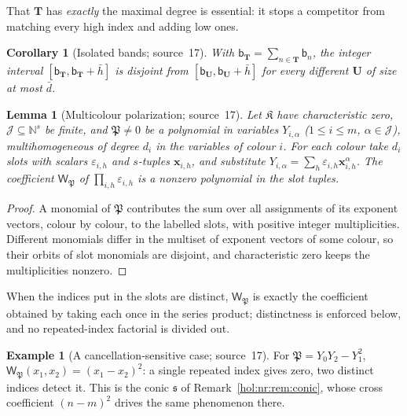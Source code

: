 \documentclass[11pt]{article}
\numberwithin{equation}{section}
\newtheorem{lemma}[theorem]{Lemma}
\newtheorem{corollary}[theorem]{Corollary}
\theoremstyle{definition}
\newtheorem{example}[theorem]{Example}
\theoremstyle{remark}
\newcommand{\N}{\mathbb N}
\begin{document}
That $\mathbf T$ has \emph{exactly} the maximal degree is essential: it stops a
competitor from matching every high index and adding low ones.

\begin{corollary}[Isolated bands; source~17]\label{hol:fh:cor:bands}
With $\mathsf b_{\mathbf T}=\sum_{n\in\mathbf T}\mathsf b_n$, the integer
interval $[\mathsf b_{\mathbf T},\mathsf b_{\mathbf T}+\bar h]$ is disjoint from
$[\mathsf b_{\mathbf U},\mathsf b_{\mathbf U}+\bar h]$ for every different
$\mathbf U$ of size at most $\bar d$.
\end{corollary}

\begin{lemma}[Multicolour polarization; source~17]\label{hol:fh:lem:polar}
Let $\mathfrak K$ have characteristic zero, $\mathcal J\subseteq\N^s$ be finite,
and $\mathfrak P\ne0$ be a polynomial in variables $Y_{i,\alpha}$
($1\le i\le m$, $\alpha\in\mathcal J$), multihomogeneous of degree $d_i$ in the
variables of colour $i$. For each colour take $d_i$ slots with scalars
$\varepsilon_{i,h}$ and $s$-tuples $\mathbf x_{i,h}$, and substitute
$Y_{i,\alpha}=\sum_h\varepsilon_{i,h}\mathbf x_{i,h}^\alpha$. The coefficient
$\mathsf W_{\mathfrak P}$ of $\prod_{i,h}\varepsilon_{i,h}$ is a nonzero
polynomial in the slot tuples.
\end{lemma}

\begin{proof}
A monomial of $\mathfrak P$ contributes the sum over all assignments of its
exponent vectors, colour by colour, to the labelled slots, with positive
integer multiplicities. Different monomials differ in the multiset of exponent
vectors of some colour, so their orbits of slot monomials are disjoint, and
characteristic zero keeps the multiplicities nonzero.
\end{proof}

When the indices put in the slots are distinct, $\mathsf W_{\mathfrak P}$ is
exactly the coefficient obtained by taking each once in the series product;
distinctness is enforced below, and no repeated-index factorial is divided
out.

\begin{example}[A cancellation-sensitive case; source~17]\label{hol:fh:ex:polar}
For $\mathfrak P=Y_0Y_2-Y_1^2$, $\mathsf W_{\mathfrak P}(x_1,x_2)=(x_1-x_2)^2$:
a single repeated index gives zero, two distinct indices detect it. This is
the conic $\mathfrak s$ of Remark~\ref{hol:nr:rem:conic}, whose cross
coefficient $(n-m)^2$ drives the same phenomenon there.
\end{example}
\end{document}
